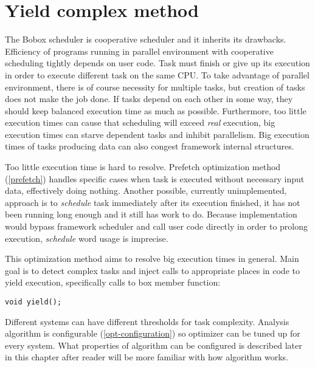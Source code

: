 \chapter{Yield complex method}
\label{yield-intro}
The Bobox scheduler is cooperative scheduler and it inherits its drawbacks. Efficiency of programs running in parallel environment with cooperative scheduling tightly depends on user code. Task must finish or give up its execution in order to execute different task on the same CPU. To take advantage of parallel environment, there is of course necessity for multiple tasks, but creation of tasks does not make the job done. If tasks depend on each other in some way, they should keep balanced execution time as much as possible. Furthermore, too little execution times can cause that scheduling will exceed \textit{real} execution, big execution times can starve dependent tasks and inhibit parallelism. Big execution times of tasks producing data can also congest framework internal structures.

Too little execution time is hard to resolve. Prefetch optimization method (\ref{prefetch}) handles specific cases when task is executed without necessary input data, effectively doing nothing. Another possible, currently unimplemented, approach is to \textit{schedule} task immediately after its execution finished, it has not been running long enough and it still has work to do. Because implementation would bypass framework scheduler and call user code directly in order to prolong execution, \textit{schedule} word usage is imprecise.

This optimization method aims to resolve big execution times in general. Main goal is to detect complex tasks and inject calls to appropriate places in code to yield execution, specifically calls to box member function:

\begin{lstlisting}
void yield();
\end{lstlisting}

Different systems can have different thresholds for task complexity. Analysis algorithm is configurable (\ref{opt-configuration}) so optimizer can be tuned up for every system. What properties of algorithm can be configured is described later in this chapter after reader will be more familiar with how algorithm works.

